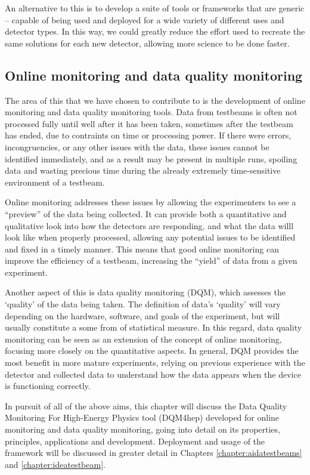 An alternative to this is to develop a suite of tools or frameworks that are generic -- capable of being used and deployed for a wide variety of different uses and detector types. In this way, we could greatly reduce the effort used to recreate the same solutions for each new detector, allowing more science to be done faster.

\subsection*{Online monitoring and data quality monitoring}
The area of this that we have chosen to contribute to is the development of online monitoring and data quality monitoring tools. Data from testbeams is often not processed fully until well after it has been taken, sometimes after the testbeam has ended, due to contraints on time or processing power. If there were errors, incongruencies, or any other issues with the data, these issues cannot be identified immediately, and as a result may be present in multiple runs, spoiling data and wasting precious time during the already extremely time-sensitive environment of a testbeam.

Online monitoring addresses these issues by allowing the experimenters to see a ``preview'' of the data being collected. It can provide both a quantitative and qualitative look into how the detectors are responding, and what the data willl look like when properly processed, allowing any potential issues to be identified and fixed in a timely manner. This means that good online monitoring can improve the efficiency of a testbeam, increasing the ``yield'' of data from a given experiment.

Another aspect of this is data quality monitoring (DQM), which assesses the `quality' of the data being taken. The definition of data's `quality' will vary depending on the hardware, software, and goals of the experiment, but will usually constitute a some from of statistical measure. In this regard, data quality monitoring can be seen as an extension of the concept of online monitoring, focusing more closely on the quantitative aspects. In general, DQM provides the most benefit in more mature experiments, relying on previous experience with the detector and collected data to understand how the data appears when the device is functioning correctly.  

In pursuit of all of the above aims, this chapter will discuss the Data Quality Monitoring For High-Energy Physics tool (DQM4hep) developed for online monitoring and data quality monitoring, going into detail on its properties, principles, applications and development. Deployment and usage of the framework will be discussed in greater detail in Chapters \ref{chapter:aidatestbeams} and \ref{chapter:ideatestbeam}.


